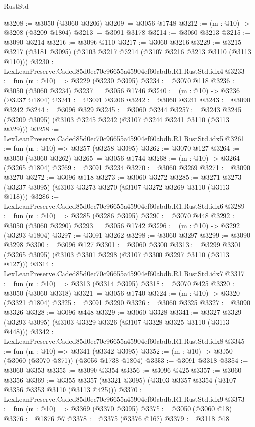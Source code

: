 \begin{lexlean}{RustStd}
\begin{coremodule}
@3208 := @3050 (@3060 @3206)
@3209 := @3056 @1748
@3212 := (m : @10) -> @3208 (@3209 @1804)
@3213 := @3091 @3178
@3214 := @3060 @3213
@3215 := @3090 @3214
@3216 := @3096 @110
@3217 := @3060 @3216
@3229 := @3215 @3217 (@3181 @3095) (@3103 @3217 @3214 (@3107 @3216 @3213 @3110 (@3113 @110)))
@3230 := LexLeanPreserve.Caded85d0ec70c96655a45904ef60abdb.R1.RustStd.idx4
@3233 := fun (m : @10) => @3229 (@3230 @3095)
@3234 := @3070 @118
@3236 := @3050 (@3060 @3234)
@3237 := @3056 @1746
@3240 := (m : @10) -> @3236 (@3237 @1804)
@3241 := @3091 @3206
@3242 := @3060 @3241
@3243 := @3090 @3242
@3244 := @3096 @329
@3245 := @3060 @3244
@3257 := @3243 @3245 (@3209 @3095) (@3103 @3245 @3242 (@3107 @3244 @3241 @3110 (@3113 @329)))
@3258 := LexLeanPreserve.Caded85d0ec70c96655a45904ef60abdb.R1.RustStd.idx5
@3261 := fun (m : @10) => @3257 (@3258 @3095)
@3262 := @3070 @127
@3264 := @3050 (@3060 @3262)
@3265 := @3056 @1744
@3268 := (m : @10) -> @3264 (@3265 @1804)
@3269 := @3091 @3234
@3270 := @3060 @3269
@3271 := @3090 @3270
@3272 := @3096 @118
@3273 := @3060 @3272
@3285 := @3271 @3273 (@3237 @3095) (@3103 @3273 @3270 (@3107 @3272 @3269 @3110 (@3113 @118)))
@3286 := LexLeanPreserve.Caded85d0ec70c96655a45904ef60abdb.R1.RustStd.idx6
@3289 := fun (m : @10) => @3285 (@3286 @3095)
@3290 := @3070 @448
@3292 := @3050 (@3060 @3290)
@3293 := @3056 @1742
@3296 := (m : @10) -> @3292 (@3293 @1804)
@3297 := @3091 @3262
@3298 := @3060 @3297
@3299 := @3090 @3298
@3300 := @3096 @127
@3301 := @3060 @3300
@3313 := @3299 @3301 (@3265 @3095) (@3103 @3301 @3298 (@3107 @3300 @3297 @3110 (@3113 @127)))
@3314 := LexLeanPreserve.Caded85d0ec70c96655a45904ef60abdb.R1.RustStd.idx7
@3317 := fun (m : @10) => @3313 (@3314 @3095)
@3318 := @3070 @425
@3320 := @3050 (@3060 @3318)
@3321 := @3056 @1740
@3324 := (m : @10) -> @3320 (@3321 @1804)
@3325 := @3091 @3290
@3326 := @3060 @3325
@3327 := @3090 @3326
@3328 := @3096 @448
@3329 := @3060 @3328
@3341 := @3327 @3329 (@3293 @3095) (@3103 @3329 @3326 (@3107 @3328 @3325 @3110 (@3113 @448)))
@3342 := LexLeanPreserve.Caded85d0ec70c96655a45904ef60abdb.R1.RustStd.idx8
@3345 := fun (m : @10) => @3341 (@3342 @3095)
@3352 := (m : @10) -> @3050 (@3060 (@3070 @871)) (@3056 @1738 @1804)
@3353 := @3091 @3318
@3354 := @3060 @3353
@3355 := @3090 @3354
@3356 := @3096 @425
@3357 := @3060 @3356
@3369 := @3355 @3357 (@3321 @3095) (@3103 @3357 @3354 (@3107 @3356 @3353 @3110 (@3113 @425)))
@3370 := LexLeanPreserve.Caded85d0ec70c96655a45904ef60abdb.R1.RustStd.idx9
@3373 := fun (m : @10) => @3369 (@3370 @3095)
@3375 := @3050 (@3060 @18)
@3376 := @1876 @7
@3378 := @3375 (@3376 @163)
@3379 := @3118 @18

\end{coremodule}
\end{lexlean}

